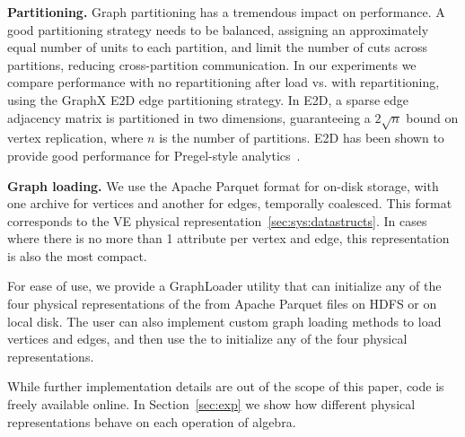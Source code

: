 {\bf Partitioning.}  Graph partitioning has a tremendous impact on
performance.  A good partitioning strategy needs to be balanced,
assigning an approximately equal number of units to each partition,
and limit the number of cuts across partitions, reducing
cross-partition communication.  In our experiments we compare
performance with no repartitioning after load vs.  with
repartitioning, using the GraphX E2D edge partitioning strategy.  In
E2D, a sparse edge adjacency matrix is partitioned in two dimensions,
guaranteeing a $2 \sqrt{n}$ bound on vertex replication, where $n$ is
the number of partitions. E2D has been shown to provide good
performance for Pregel-style
analytics~\cite{DBLP:conf/osdi/GonzalezXDCFS14,MoffittTempWeb16}.

{\bf Graph loading.}  We use the Apache Parquet format for on-disk
storage, with one archive for vertices and another for edges,
temporally coalesced.  This format corresponds to the VE physical
representation~\ref{sec:sys:datastructs}.  In cases where there is no
more than 1 attribute per vertex and edge, this representation is also
the most compact.  

For ease of use, we provide a GraphLoader utility that can initialize
any of the four physical representations of the \tg from Apache
Parquet files on HDFS or on local disk.  The \ql user can also
implement custom graph loading methods to load vertices and edges, and
then use the  to initialize any of the four physical
representations.

 While further implementation
details are out of the scope of this paper, \ql code is freely
available online.  In Section~\ref{sec:exp} we show how different physical
representations behave on each operation of \tg algebra.



